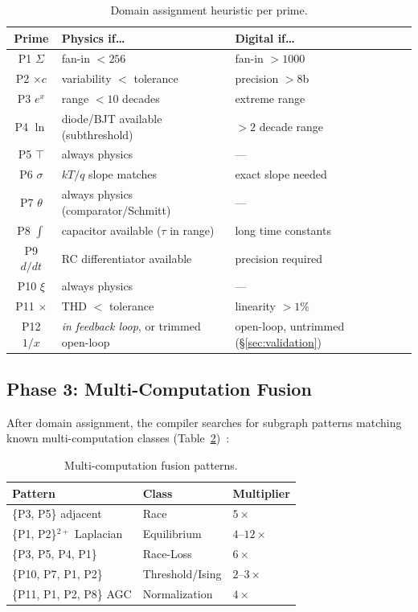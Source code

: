 \documentclass[11pt]{article}
\begin{document}
\begin{table}[h]
\centering
\caption{Domain assignment heuristic per prime.}
\label{tab:assignment}
\small
\begin{tabular}{clll}
\toprule
Prime & Physics if\ldots & Digital if\ldots \\
\midrule
P1 $\Sigma$ & fan-in $< 256$ & fan-in $> 1000$ \\
P2 $\times c$ & variability $<$ tolerance & precision $> 8$b \\
P3 $e^x$ & range $< 10$ decades & extreme range \\
P4 $\ln$ & diode/BJT available (subthreshold) & $> 2$ decade range \\
P5 $\top$ & always physics & --- \\
P6 $\sigma$ & $kT/q$ slope matches & exact slope needed \\
P7 $\theta$ & always physics (comparator/Schmitt) & --- \\
P8 $\int$ & capacitor available ($\tau$ in range) & long time constants \\
P9 $d/dt$ & RC differentiator available & precision required \\
P10 $\xi$ & always physics & --- \\
P11 $\times$ & THD $<$ tolerance & linearity $> 1\%$ \\
P12 $1/x$ & \textit{in feedback loop}, or trimmed open-loop & open-loop, untrimmed (\S\ref{sec:validation}) \\
\bottomrule
\end{tabular}
\end{table}

\subsection{Phase 3: Multi-Computation Fusion}

After domain assignment, the compiler searches for subgraph patterns matching known multi-computation classes (Table~\ref{tab:fusion})~\cite{bieg2026}:

\begin{table}[h]
\centering
\caption{Multi-computation fusion patterns.}
\label{tab:fusion}
\small
\begin{tabular}{lll}
\toprule
Pattern & Class & Multiplier \\
\midrule
\{P3, P5\} adjacent & Race & $5\times$ \\
\{P1, P2\}$^{2+}$ Laplacian & Equilibrium & $4$--$12\times$ \\
\{P3, P5, P4, P1\} & Race-Loss & $6\times$ \\
\{P10, P7, P1, P2\} & Threshold/Ising & $2$--$3\times$ \\
\{P11, P1, P2, P8\} AGC & Normalization & $4\times$ \\
\bottomrule
\end{tabular}
\end{table}
\end{document}
